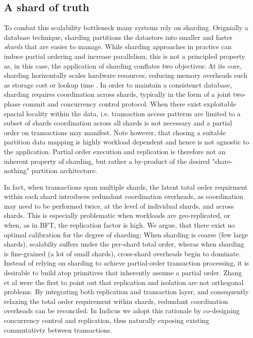 \subsection{A shard of truth}
To combat this scalability bottleneck many systems rely on sharding. Orignially a database technique, sharding partitions the datastore into smaller and faster \textit{shards} that are easier to manage. While sharding approaches in practice  can induce partial ordering and increase parallelism, this is not a principled property as, in this case, the application of sharding conflates two objectives:
At its core, sharding horizontally scales hardware resources, reducing memory overheads such as storage cost or lookup time . In order to maintain a consistenct database, sharding requires coordination across shards, typically in the form of a joint two-phase commit and concurrency control protocol. 
When there exist exploitable spacial locality within the data, i.e. transaction access patterns are limited to a subset of shards coordination across all shards is not necessary and a partial order on transactions may manifest. Note however, that chosing a suitable partition data mapping is highly workload dependent and hence  is not agnostic to the application.
Partial order execution and replication is therefore not an inherent property of sharding, but rather a by-product of the desired "share-nothing" partition architecture. 

In fact, when transactions span multiple shards, the latent total order requirment within each shard introduces redundant coordination overheads, as coordination may need to be performed twice, at the level of individual shards, and across shards. This is especially problematic when workloads are geo-replicated, or when, as in BFT, the replication factor is high. 
We argue, that there exist no optimal calibration for the degree of sharding: When sharding is coarse (few large shards), scalabiliy suffers under the per-shard total order, wheras when sharding is fine-grained (a lot of small shards), cross-shard overheads begin to dominate. 
Instead of relying on sharding to achieve partial-order transaction processing, it is desirable to build atop primitives that inherently assume a partial order.
Zhang et al \cite{zhang2016operation, zhang2015tapir} were the first to point out that replication and isolation are not orthogonal problems. By integrating both replication and transaction layer, and consequently relaxing the total order requirement within shards, redundant coordination overheads can be reconciled.
In Indicus we adopt this rationale by co-designing concurrency control and replication, thus naturally exposing existing commutativty between transactions.



